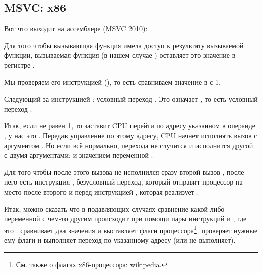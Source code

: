 \subsection{MSVC: x86}

Вот что выходит на ассемблере (MSVC 2010):



Для того чтобы вызывающая функция имела доступ к результату вызываемой функции, 
вызываемая функция (в нашем случае \scanf) оставляет это значение в регистре \EAX.

Мы проверяем его инструкцией  (), то есть сравниваем значение в \EAX с 1.

Следующий за инструкцией \CMP: условный переход \JNE. Это означает , то есть условный переход .

Итак, если \EAX не равен 1, то \JNE заставит \ac{CPU} перейти по адресу указанном в операнде \JNE, у нас это .
Передав управление по этому адресу, \ac{CPU} начнет исполнять вызов \printf с аргументом .
Но если всё нормально, перехода не случится и исполнится другой \printf с двумя аргументами:  и значением переменной .

Для того чтобы после этого вызова не исполнился сразу второй вызов \printf, 
после него есть инструкция \JMP, безусловный переход, который отправит процессор на место 
после второго \printf и перед инструкцией , которая реализует .

Итак, можно сказать что в подавляющих случаях сравнение какой-либо переменной с чем-то другим происходит при помощи пары инструкций \CMP и \Jcc, где  это .
\CMP сравнивает два значения и выставляет  флаги процессора\footnote{См. также о флагах x86-процессора: \href{http://go.yurichev.com/17120}{wikipedia}.}.
\Jcc проверяет нужные ему флаги и выполняет переход по указанному адресу (или не выполняет).

